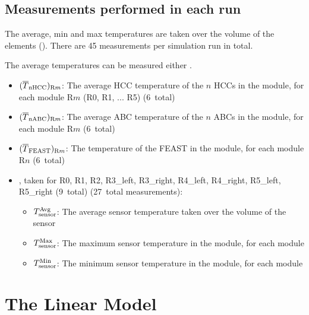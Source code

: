 \subsection{Measurements performed in each run}


The average, min and max temperatures are taken over the volume of the elements ().
There are 45 measurements per simulation run in total.

The average temperatures can be measured either .

\begin{itemize}
\item $(\overline{T}_\text{nHCC})_{{\text{R}m}}$: The average HCC temperature of the $n$ HCCs in the module, for each module R$m$ (R0, R1, ... R5) (6~total)
\item $(\overline{T}_\text{nABC})_{{\text{R}m}}$: The average ABC temperature of the $n$ ABCs in the module, for each module R$m$ (6~total)
\item $(\overline{T}_\text{FEAST})_{{\text{R}m}}$: The temperature of the FEAST in the module, for each module R$n$ (6~total)
\item \tsensor, taken for R0, R1, R2, R3\_left, R3\_right, R4\_left, R4\_right, R5\_left, R5\_right (9~total) (27~total measurements):
\begin{itemize}
  \item $T_\text{sensor}^\text{Avg}$: The average sensor temperature taken over the volume of the sensor
  \item $T_\text{sensor}^\text{Max}$: The maximum sensor temperature in the module, for each module
  \item $T_\text{sensor}^\text{Min}$: The minimum sensor temperature in the module, for each module
\end{itemize}
\end{itemize}




\section{The Linear Model}

